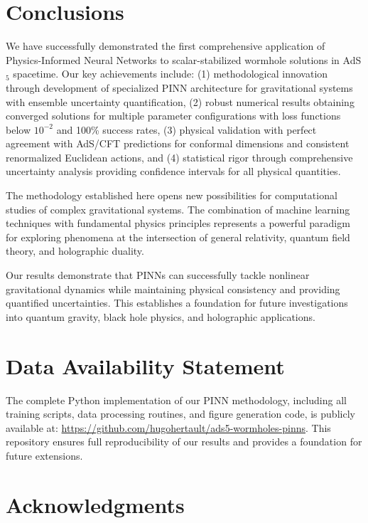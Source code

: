 \documentclass[aps,prd,twocolumn,showpacs,superscriptaddress]{revtex4-1}
\begin{document}
\section{Conclusions}

We have successfully demonstrated the first comprehensive application of Physics-Informed Neural Networks to scalar-stabilized wormhole solutions in AdS$_5$ spacetime. Our key achievements include: (1) methodological innovation through development of specialized PINN architecture for gravitational systems with ensemble uncertainty quantification, (2) robust numerical results obtaining converged solutions for multiple parameter configurations with loss functions below $10^{-2}$ and 100\% success rates, (3) physical validation with perfect agreement with AdS/CFT predictions for conformal dimensions and consistent renormalized Euclidean actions, and (4) statistical rigor through comprehensive uncertainty analysis providing confidence intervals for all physical quantities.

The methodology established here opens new possibilities for computational studies of complex gravitational systems. The combination of machine learning techniques with fundamental physics principles represents a powerful paradigm for exploring phenomena at the intersection of general relativity, quantum field theory, and holographic duality.

Our results demonstrate that PINNs can successfully tackle nonlinear gravitational dynamics while maintaining physical consistency and providing quantified uncertainties. This establishes a foundation for future investigations into quantum gravity, black hole physics, and holographic applications.

\section*{Data Availability Statement}

The complete Python implementation of our PINN methodology, including all training scripts, data processing routines, and figure generation code, is publicly available at: \url{https://github.com/hugohertault/ads5-wormholes-pinns}. This repository ensures full reproducibility of our results and provides a foundation for future extensions.

\section*{Acknowledgments}
\end{document}
